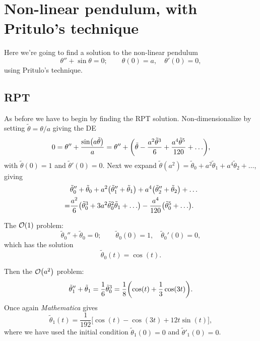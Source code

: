 \documentclass[11pt,letter, swedish, english
]{article}
\renewcommand{\thesubsection}{\arabic{section} (\alph{subsection})}
\begin{document}
\section{Non-linear pendulum, with Pritulo's technique}
\renewcommand{\thesubsection}{\arabic{section} (\roman{subsection})}
Here we're going to find a solution to the non-linear pendulum
\begin{equation}
\theta''+\sin\theta =0;\qquad
\theta(0)=a,\quad \theta'(0)=0,
\end{equation}
using Pritulo's technique.

\subsection{RPT}
\newcommand{\TT}{\ensuremath{\tilde{\theta}}}
As before we have to begin by finding the RPT
solution. Non-dimensionalize by setting $\TT=\theta/a$ giving the DE
\begin{equation}
0=\theta''+\frac{\sin(a\TT)}{a} 
=\theta''+\qty(\TT-\frac{a^2\TT^3}{6}+\frac{a^4\TT^5}{120}+\ldots),
\end{equation}
with $\TT(0)=1$ and $\TT'(0)=0$.
Next we expand $\TT(a^2)=\TT_0+a^2\TT_1+a^4\TT_2+\ldots$, giving
\begin{equation}
\begin{aligned}
&\TT_0''+\TT_0+a^2\qty(\TT_1''+\TT_1)+a^4\qty(\TT_2''+\TT_2)+\ldots\\
=&\frac{a^2}{6}\qty(\TT_0^3+3a^2\TT_0^2\TT_1+\ldots) 
- \frac{a^4}{120}\qty(\TT_0^5+\ldots).
\end{aligned}
\end{equation}

The $\order{1}$ problem:
\begin{equation}
\TT_0''+\TT_0=0;\qquad
\TT_0(0)=1,\quad {\TT_0'}(0)=0,
\end{equation}
which has the solution
\begin{equation}\label{eq:5_TT0}
\TT_0(t)=\cos(t).
\end{equation}

Then the $\order{a^2}$ problem:
\begin{equation}
\TT_1''+\TT_1=\frac{1}{6}\TT_0^3
=\frac{1}{8}\qty(\cos(t) +\frac{1}{3}\cos(3t)).
\end{equation}
Once again \textit{Mathematica} gives
\begin{equation}\label{eq:5_TT1}
\TT_1(t)=\frac{1}{192}\Big[\cos(t) - \cos(3t) + 12t\sin(t)\Big],
\end{equation}
where we have used the initial condition $\TT_1(0)=0$ and
$\TT'_1(0)=0$. 
\end{document}
